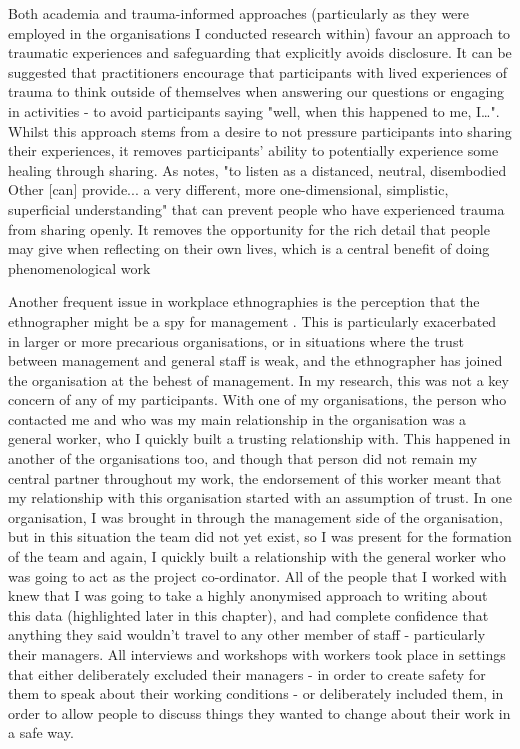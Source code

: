 Both academia and trauma-informed approaches (particularly as they were employed in the organisations I conducted research within) favour an approach to traumatic experiences and safeguarding that explicitly avoids disclosure. It can be suggested that practitioners encourage that participants with lived experiences of trauma to think outside of themselves when answering our questions or engaging in activities - to avoid participants saying "well, when this happened to me, I…". Whilst this approach stems from a desire to not pressure participants into sharing their experiences, it removes participants' ability to potentially experience some healing through sharing. As \citet[56]{carless_narrating_2016} notes, "to listen as a distanced, neutral, disembodied Other [can] provide... a very different, more one-dimensional, simplistic, superficial understanding" that can prevent people who have experienced trauma from sharing openly. It removes the opportunity for the rich detail that people may give when reflecting on their own lives, which is a central benefit of doing phenomenological work

Another frequent issue in workplace ethnographies is the perception that the ethnographer might be a spy for management \citep{baum-talmor_its_2019}. This is particularly exacerbated in larger or more precarious organisations, or in situations where the trust between management and general staff is weak, and the ethnographer has joined the organisation at the behest of management. In my research, this was not a key concern of any of my participants. With one of my organisations, the person who contacted me and who was my main relationship in the organisation was a general worker, who I quickly built a trusting relationship with. This happened in another of the organisations too, and though that person did not remain my central partner throughout my work, the endorsement of this worker meant that my relationship with this organisation started with an assumption of trust. In one organisation, I was brought in through the management side of the organisation, but in this situation the team did not yet exist, so I was present for the formation of the team and again, I quickly built a relationship with the general worker who was going to act as the project co-ordinator. All of the people that I worked with knew that I was going to take a highly anonymised approach to writing about this data (highlighted later in this chapter), and had complete confidence that anything they said wouldn’t travel to any other member of staff - particularly their managers. All interviews and workshops with workers took place in settings that either deliberately excluded their managers - in order to create safety for them to speak about their working conditions - or deliberately included them, in order to allow people to discuss things they wanted to change about their work in a safe way.  

